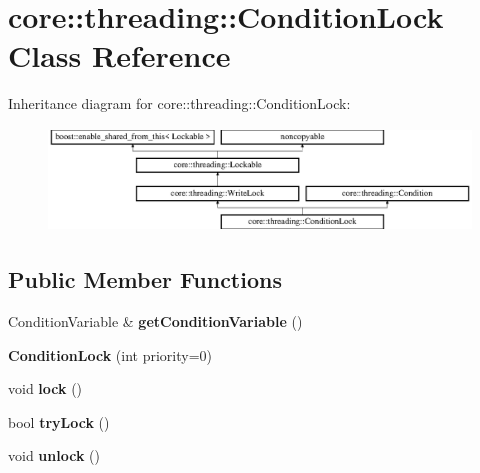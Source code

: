 \hypertarget{classcore_1_1threading_1_1_condition_lock}{\section{core\-:\-:threading\-:\-:Condition\-Lock Class Reference}
\label{classcore_1_1threading_1_1_condition_lock}
}
Inheritance diagram for core\-:\-:threading\-:\-:Condition\-Lock\-:\begin{figure}[H]
\begin{center}
\leavevmode
\includegraphics[height=2.735043cm]{classcore_1_1threading_1_1_condition_lock}
\end{center}
\end{figure}
\subsection*{Public Member Functions}
\begin{DoxyCompactItemize}
\item 
\hypertarget{classcore_1_1threading_1_1_condition_lock_a141e3dab3f8851271db1a4369b680fc0}{Condition\-Variable \& {\bfseries get\-Condition\-Variable} ()}\label{classcore_1_1threading_1_1_condition_lock_a141e3dab3f8851271db1a4369b680fc0}

\item 
\hypertarget{classcore_1_1threading_1_1_condition_lock_ad93c138e4b1fee83c5cf087be1d11919}{{\bfseries Condition\-Lock} (int priority=0)}\label{classcore_1_1threading_1_1_condition_lock_ad93c138e4b1fee83c5cf087be1d11919}

\item 
\hypertarget{classcore_1_1threading_1_1_condition_lock_a199dc12c265f08397ef9ae259d4c4ffb}{void {\bfseries lock} ()}\label{classcore_1_1threading_1_1_condition_lock_a199dc12c265f08397ef9ae259d4c4ffb}

\item 
\hypertarget{classcore_1_1threading_1_1_condition_lock_ac9cc6da794d6ef86923445afec3a0372}{bool {\bfseries try\-Lock} ()}\label{classcore_1_1threading_1_1_condition_lock_ac9cc6da794d6ef86923445afec3a0372}

\item 
\hypertarget{classcore_1_1threading_1_1_condition_lock_ac7a0033e3aad4dc2ac4d19b235e614c0}{void {\bfseries unlock} ()}\label{classcore_1_1threading_1_1_condition_lock_ac7a0033e3aad4dc2ac4d19b235e614c0}

\end{DoxyCompactItemize}
